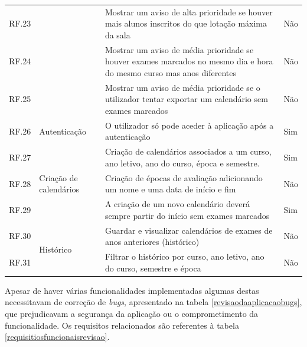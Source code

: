 \documentclass[12pt, twoside]{report}
\begin{document}
\begin{center}
\begin{longtable}{|m{1cm}|m{2.2cm}|m{9cm}|m{3cm}|}
			RF.23 && Mostrar um aviso de alta prioridade se houver mais alunos inscritos do que  lotação máxima da sala & Não\\
			
			RF.24 && Mostrar um aviso de média prioridade se houver exames marcados no mesmo dia e hora do mesmo curso mas anos diferentes & Não\\
			
			
			RF.25 && Mostrar um aviso de média prioridade se o utilizador tentar exportar um calendário sem exames marcados & Não\\
			\hline
			
			RF.26 &Autenticação& O utilizador só pode aceder à aplicação após a autenticação & Sim\\
			\hline
			
			RF.27 &\multirow{3}{2cm}{Criação de calendários}&Criação de calendários associados a um curso, ano letivo, ano do curso, época e semestre.& Sim \\
			
			RF.28 && Criação de épocas de avaliação adicionando um nome e uma data de início e fim & Não \\
			
			RF.29 && A criação de um novo calendário deverá sempre partir do início sem exames marcados & Sim\\
			\hline
			RF.30 &\multirow{2}{*}{Histórico}& Guardar e visualizar calendários de exames de anos anteriores (histórico)& Não \\
			
			RF.31 && Filtrar o histórico por curso, ano letivo, ano do curso, semestre e época& Não \\
			\hline
		\end{longtable}
	\end{center}
	
	Apesar de haver várias funcionalidades implementadas algumas destas necessitavam de correção de \textit{bugs}, apresentado na tabela \ref{revisaodaaplicacaobugs}, que prejudicavam a segurança da aplicação ou o comprometimento da funcionalidade. Os requisitos relacionados são referentes à tabela \ref{requisitiosfuncionaisrevisao}.
	
\end{document}
